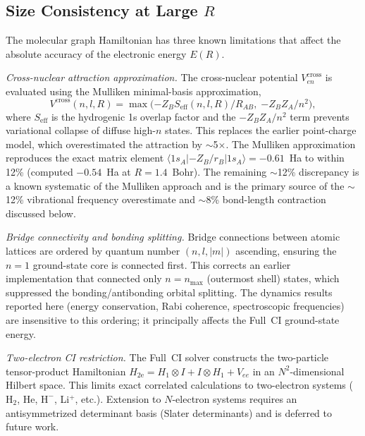 \documentclass[aps,pra,twocolumn,superscriptaddress,longbibliography,floatfix]{revtex4-2}
\begin{document}
\subsection{Size Consistency at Large $R$}
\label{sec:size-consistency}

The molecular graph Hamiltonian has three known limitations that
affect the absolute accuracy of the electronic energy $E(R)$.

\textit{Cross-nuclear attraction approximation.}
The cross-nuclear potential $V_{en}^{\mathrm{cross}}$ is evaluated
using the Mulliken minimal-basis approximation,
\begin{equation}
  V^{\mathrm{cross}}(n,l,R) = \max\!\bigl(
    {-Z_B S_{\mathrm{eff}}(n,l,R)/R_{AB}},\;
    {-Z_B Z_A / n^2}
  \bigr),
  \label{eq:vcross}
\end{equation}
where $S_{\mathrm{eff}}$ is the hydrogenic 1s overlap factor and the
$-Z_B Z_A/n^2$ term prevents variational collapse of diffuse
high-$n$ states. This replaces the earlier point-charge model, which
overestimated the attraction by $\sim$5$\times$. The Mulliken
approximation reproduces the exact matrix element
$\langle 1s_A | -Z_B/r_B | 1s_A \rangle = -0.61$~Ha to within
12\% (computed $-0.54$~Ha at $R = 1.4$~Bohr). The remaining
$\sim$12\% discrepancy is a known systematic of the Mulliken approach
and is the primary source of the $\sim$12\% vibrational frequency
overestimate and $\sim$8\% bond-length contraction discussed below.

\textit{Bridge connectivity and bonding splitting.}
Bridge connections between atomic lattices are ordered by quantum
number $(n, l, |m|)$ ascending, ensuring the $n=1$ ground-state
core is connected first. This corrects an earlier implementation
that connected only $n = n_{\max}$ (outermost shell) states,
which suppressed the bonding/antibonding orbital splitting.
The dynamics results reported here (energy conservation, Rabi
coherence, spectroscopic frequencies) are insensitive to this
ordering; it principally affects the Full~CI ground-state energy.

\textit{Two-electron CI restriction.}
The Full~CI solver constructs the two-particle tensor-product
Hamiltonian $H_{\mathrm{2e}} = H_1 \otimes I + I \otimes H_1 +
V_{ee}$ in an $N^2$-dimensional Hilbert space. This limits exact
correlated calculations to two-electron systems ($\mathrm{H}_2$,
He, $\mathrm{H}^-$, Li$^+$, etc.). Extension to $N$-electron
systems requires an antisymmetrized determinant basis (Slater
determinants) and is deferred to future work.
\end{document}

